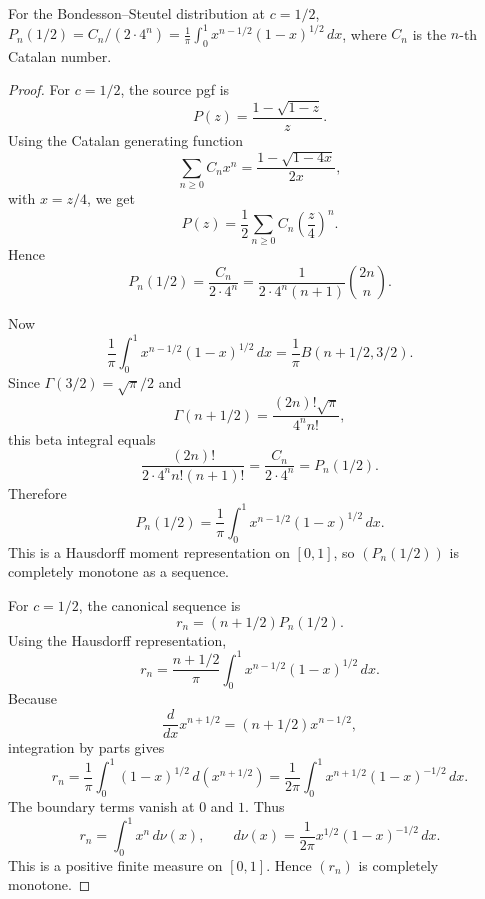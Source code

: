 \begin{lemma}[Bondesson Steutel c=1/2 Catalan beta Hausdorff representation]
\label{res:bs-c-half-catalan-hausdorff-representation}
For the Bondesson--Steutel distribution at \(c=1/2\), \(P_n(1/2)=C_n/(2\cdot4^n)=\frac{1}{\pi}\int_0^1 x^{n-1/2}(1-x)^{1/2}\,dx\), where \(C_n\) is the \(n\)-th Catalan number.
\end{lemma}
\begin{proof}
For \(c=1/2\), the source pgf is
\[
P(z)=\frac{1-\sqrt{1-z}}{z}.
\]
Using the Catalan generating function
\[
\sum_{n\ge0}C_n x^n=\frac{1-\sqrt{1-4x}}{2x},
\]
with \(x=z/4\), we get
\[
P(z)=\frac12\sum_{n\ge0}C_n\left(\frac z4\right)^n.
\]
Hence
\[
P_n(1/2)=\frac{C_n}{2\cdot4^n}
=\frac{1}{2\cdot4^n(n+1)}\binom{2n}{n}.
\]

Now
\[
\frac1\pi\int_0^1 x^{n-1/2}(1-x)^{1/2}\,dx
=\frac1\pi B(n+1/2,3/2).
\]
Since \(\Gamma(3/2)=\sqrt\pi/2\) and
\[
\Gamma(n+1/2)=\frac{(2n)!\sqrt\pi}{4^n n!},
\]
this beta integral equals
\[
\frac{(2n)!}{2\cdot4^n n!(n+1)!}
=\frac{C_n}{2\cdot4^n}
=P_n(1/2).
\]
Therefore
\[
P_n(1/2)=\frac1\pi\int_0^1 x^{n-1/2}(1-x)^{1/2}\,dx.
\]
This is a Hausdorff moment representation on \([0,1]\), so \((P_n(1/2))\) is completely monotone as a sequence.

For \(c=1/2\), the canonical sequence is
\[
r_n=(n+1/2)P_n(1/2).
\]
Using the Hausdorff representation,
\[
r_n=\frac{n+1/2}{\pi}\int_0^1 x^{n-1/2}(1-x)^{1/2}\,dx.
\]
Because
\[
\frac{d}{dx}x^{n+1/2}=(n+1/2)x^{n-1/2},
\]
integration by parts gives
\[
r_n
=\frac1\pi\int_0^1 (1-x)^{1/2}\,d(x^{n+1/2})
=\frac{1}{2\pi}\int_0^1 x^{n+1/2}(1-x)^{-1/2}\,dx.
\]
The boundary terms vanish at \(0\) and \(1\). Thus
\[
r_n=\int_0^1 x^n\,d\nu(x),
\qquad
d\nu(x)=\frac{1}{2\pi}x^{1/2}(1-x)^{-1/2}\,dx.
\]
This is a positive finite measure on \([0,1]\). Hence \((r_n)\) is completely monotone.
\end{proof}

